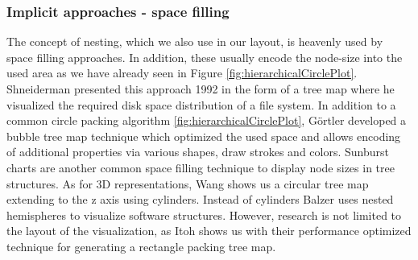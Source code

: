 \subsubsection{Implicit approaches - space filling}
The concept of nesting, which we also use in our layout, is heavenly used by space filling approaches. In addition, these usually encode the node-size into the used area as we have already seen in Figure \ref{fig:hierarchicalCirclePlot}.
Shneiderman \cite{shneiderman_tree_1992} presented this approach 1992 in the form of a tree map where he visualized the required disk space distribution of a file system. In addition to a common circle packing algorithm \ref{fig:hierarchicalCirclePlot}, Görtler \cite{gortler_bubble_2018} developed a bubble tree map technique which optimized the used space and allows encoding of additional properties via various shapes, draw strokes and colors. Sunburst charts are another common space filling technique to display node sizes in tree structures. 
As for 3D representations, Wang \cite{wang_visualization_2006} shows us a circular tree map extending to the z axis using cylinders. Instead of cylinders Balzer \cite{balzer_hierarchy_2004} uses nested hemispheres to visualize software structures.
However, research is not limited to the layout of the visualization, as Itoh \cite{itoh_hierarchical_2004} shows us with their performance optimized technique for generating a rectangle packing tree map.

